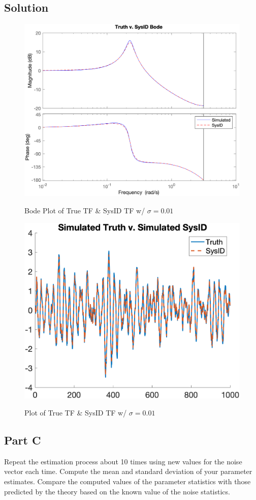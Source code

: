 \documentclass{article}
\begin{document}
\subsection*{Solution}
\begin{figure}[H]
    \centering
    \includegraphics[width=0.75\linewidth]{../figures/p4b_bode.png}\label{fig:p4b_bode}
    \caption{Bode Plot of True TF \& SysID TF w/ $\sigma=0.01$}
\end{figure}
\begin{figure}[H]
    \centering
    \includegraphics[width=0.75\linewidth]{../figures/p4b_tf.png}\label{fig:p4b_tf}
    \caption{Plot of True TF \& SysID TF w/ $\sigma=0.01$}
\end{figure}

\subsection*{Part C}
Repeat the estimation process about 10 times using new values for the noise vector each time.  Compute the mean and standard deviation of your 
parameter estimates.  Compare the computed values of the parameter statistics with those predicted by the theory based on the known value of 
the noise statistics.
\end{document}
